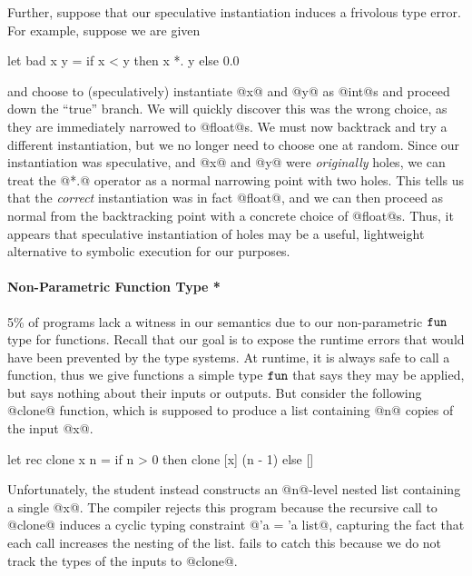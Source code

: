 Further, suppose that our speculative instantiation induces a frivolous
type error.
%
For example, suppose we are given
%
\begin{code}
  let bad x y =
    if x < y then
      x *. y
    else
      0.0
\end{code}
%
and choose to (speculatively) instantiate @x@ and @y@ as @int@s and proceed
down the ``true'' branch.
%
We will quickly discover this was the wrong choice, as they are immediately
narrowed to @float@s.
%
We must now backtrack and try a different instantiation, but we no
longer need to choose one at random.
%
Since our instantiation was speculative, and @x@ and @y@
were \emph{originally} holes, we can treat the @*.@ operator as a normal
narrowing point with two holes.
%
This tells us that the \emph{correct} instantiation was in fact @float@,
and we can then proceed as normal from the backtracking point with a
concrete choice of @float@s.
%
Thus, it appears that speculative instantiation of holes may be a
useful, lightweight alternative to symbolic execution for our purposes.



\paragraph{Non-Parametric Function Type *}
%
5\% of programs lack a witness in our semantics due to our
non-parametric $\mathtt{fun}$ type for functions.
%
Recall that our goal is to expose the runtime errors that would have
been prevented by the type systems.
%
At runtime, it is always safe to call a function, thus we give functions
a simple type $\mathtt{fun}$ that says they may be applied, but says nothing
about their inputs or outputs.
%
But consider the following @clone@ function, which is supposed to
produce a list containing @n@ copies of the input @x@.
%
%
\begin{code}
  let rec clone x n =
    if n > 0 then
      clone [x] (n - 1)
    else
      []
\end{code}
%
Unfortunately, the student instead constructs an @n@-level nested list
containing a single @x@.
%
The \ocaml compiler rejects this program because the recursive call to
@clone@ induces a cyclic typing constraint @'a = 'a list@, capturing the
fact that each call increases the nesting of the list.
%
\toolname fails to catch this because we do not track the types of the
inputs to @clone@.

